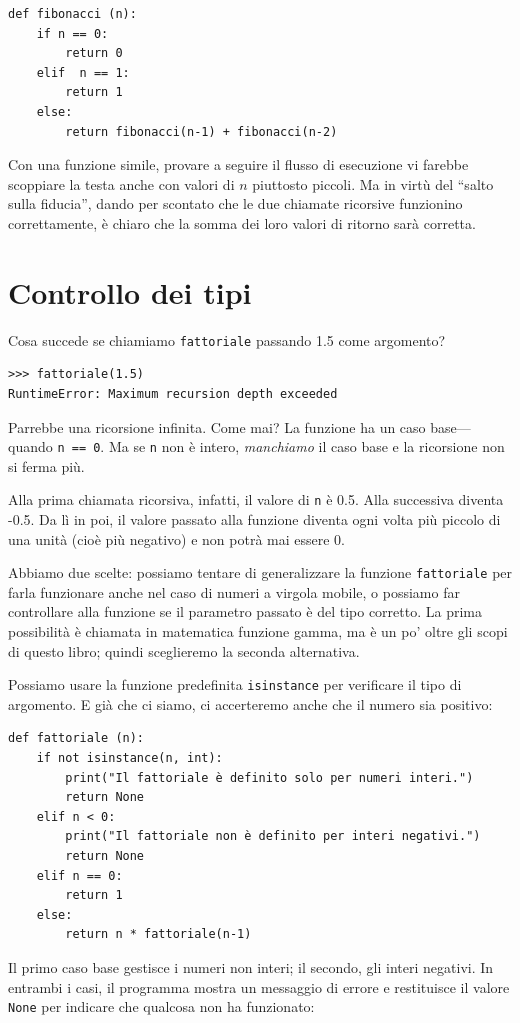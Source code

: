 \documentclass[10pt]{book}
\begin{document}
\begin{verbatim}
def fibonacci (n):
    if n == 0:
        return 0
    elif  n == 1:
        return 1
    else:
        return fibonacci(n-1) + fibonacci(n-2)
\end{verbatim}
%
Con una funzione simile, provare a seguire il flusso di esecuzione vi farebbe scoppiare la testa anche con valori di $n$ piuttosto piccoli. Ma in virtù del ``salto sulla fiducia'', dando per scontato che le due chiamate ricorsive funzionino correttamente, è chiaro che la somma dei loro valori di ritorno sarà corretta.


\section{Controllo dei tipi}
\label{guardian}

Cosa succede se chiamiamo {\tt fattoriale} passando 1.5 come argomento?

\begin{verbatim}
>>> fattoriale(1.5)
RuntimeError: Maximum recursion depth exceeded
\end{verbatim}
%
Parrebbe una ricorsione infinita. Come mai?
La funzione ha un caso base---quando {\tt n == 0}.  Ma se {\tt n} non è intero,
{\em manchiamo} il caso base e la ricorsione non si ferma più.

Alla prima chiamata ricorsiva, infatti, il valore di {\tt n} è 0.5.
Alla successiva diventa -0.5. Da lì in poi, il valore passato alla funzione diventa ogni volta più piccolo di una unità (cioè più negativo) e non potrà mai essere 0.

Abbiamo due scelte: possiamo tentare di generalizzare la funzione {\tt fattoriale} per farla funzionare anche nel caso di numeri a virgola mobile, o possiamo far controllare alla funzione se il parametro passato è del tipo corretto. La prima possibilità è chiamata in matematica funzione gamma, ma è un po' oltre gli scopi di questo libro; quindi sceglieremo la seconda alternativa.

Possiamo usare la funzione predefinita {\tt isinstance} per verificare il tipo di argomento. E già che ci siamo, ci accerteremo anche che il numero sia positivo:

\begin{verbatim}
def fattoriale (n):
    if not isinstance(n, int):
        print("Il fattoriale è definito solo per numeri interi.")
        return None
    elif n < 0:
        print("Il fattoriale non è definito per interi negativi.")
        return None
    elif n == 0:
        return 1
    else:
        return n * fattoriale(n-1)
\end{verbatim}
%
Il primo caso base gestisce i numeri non interi; il secondo, gli interi negativi. In entrambi i casi, il programma mostra un messaggio di errore e restituisce il valore {\tt None} per indicare che qualcosa non ha funzionato:
\end{document}
